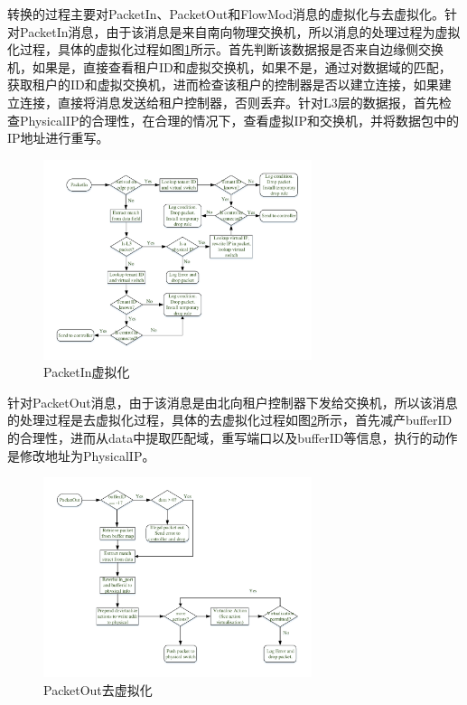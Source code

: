 转换的过程主要对PacketIn、PacketOut和FlowMod消息的虚拟化与去虚拟化。针对PacketIn消息，由于该消息是来自南向物理交换机，所以消息的处理过程为虚拟化过程，具体的虚拟化过程如图\ref{fig:packetin}所示。首先判断该数据报是否来自边缘侧交换机，如果是，直接查看租户ID和虚拟交换机，如果不是，通过对数据域的匹配，获取租户的ID和虚拟交换机，进而检查该租户的控制器是否以建立连接，如果建立连接，直接将消息发送给租户控制器，否则丢弃。针对L3层的数据报，首先检查PhysicalIP的合理性，在合理的情况下，查看虚拟IP和交换机，并将数据包中的IP地址进行重写。

\begin{figure}[!htb]
  \centering
  \includegraphics[width=0.7\textwidth]{logo/PacketIn}
  \caption{PacketIn虚拟化}
  \label{fig:packetin}
\end{figure}

针对PacketOut消息，由于该消息是由北向租户控制器下发给交换机，所以该消息的处理过程是去虚拟化过程，具体的去虚拟化过程如图\ref{fig:packetout}所示，首先减产bufferID的合理性，进而从data中提取匹配域，重写端口以及bufferID等信息，执行的动作是修改地址为PhysicalIP。

\begin{figure}[!htb]
  \centering
  \includegraphics[width=0.7\textwidth]{logo/PacketOut}
  \caption{PacketOut去虚拟化}
  \label{fig:packetout}
\end{figure}

